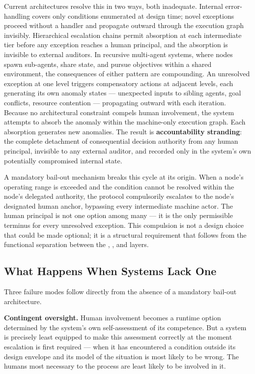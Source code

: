 Current architectures resolve this in two ways, both inadequate. Internal error-handling covers only conditions enumerated at design time; novel exceptions proceed without a handler and propagate outward through the execution graph invisibly. Hierarchical escalation chains permit absorption at each intermediate tier before any exception reaches a human principal, and the absorption is invisible to external auditors. In recursive multi-agent systems, where nodes spawn sub-agents, share state, and pursue objectives within a shared environment, the consequences of either pattern are compounding. An unresolved exception at one level triggers compensatory actions at adjacent levels, each generating its own anomaly states — unexpected inputs to sibling agents, goal conflicts, resource contention — propagating outward with each iteration. Because no architectural constraint compels human involvement, the system attempts to absorb the anomaly within the machine-only execution graph. Each absorption generates new anomalies. The result is \textbf{accountability stranding}: the complete detachment of consequential decision authority from any human principal, invisible to any external auditor, and recorded only in the system's own potentially compromised internal state.

A mandatory bail-out mechanism breaks this cycle at its origin. When a node's operating range is exceeded and the condition cannot be resolved within the node's delegated authority, the protocol compulsorily escalates to the node's designated human anchor, bypassing every intermediate machine actor. The human principal is not one option among many — it is the only permissible terminus for every unresolved exception. This compulsion is not a design choice that could be made optional; it is a structural requirement that follows from the functional separation between the \purpose, \bounds, and \fact layers.

\subsection{What Happens When Systems Lack One}

Three failure modes follow directly from the absence of a mandatory bail-out architecture.

\textbf{Contingent oversight.} Human involvement becomes a runtime option determined by the system's own self-assessment of its competence. But a system is precisely least equipped to make this assessment correctly at the moment escalation is first required — when it has encountered a condition outside its design envelope and its model of the situation is most likely to be wrong. The humans most necessary to the process are least likely to be involved in it.

